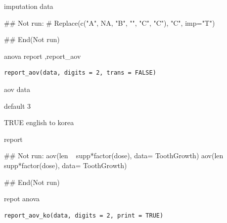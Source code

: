 \documentclass[a4paper]{book}
\begin{document}
%
\begin{Value}
imputation data
\end{Value}
%
\begin{Examples}
\begin{ExampleCode}

\#\# Not run: 
# Replace(c("A", NA, "B", "", "C", "C"), "C", imp="T")

## End(Not run)

\end{ExampleCode}
\end{Examples}
%
\begin{Description}
anova report ,report\_aov
\end{Description}
%
\begin{Usage}
\begin{verbatim}
report_aov(data, digits = 2, trans = FALSE)
\end{verbatim}
\end{Usage}
%
\begin{Arguments}
\begin{ldescription}
\item[\code{data}] aov data

\item[\code{digits}] default 3

\item[\code{trans}] TRUE english to korea
\end{ldescription}
\end{Arguments}
%
\begin{Value}
report
\end{Value}
%
\begin{Examples}
\begin{ExampleCode}
\#\# Not run: 
aov(len ~ supp*factor(dose), data= ToothGrowth) %
aov(len ~ supp*factor(dose), data= ToothGrowth) %



## End(Not run)


\end{ExampleCode}
\end{Examples}
%
\begin{Description}
repot anova
\end{Description}
%
\begin{Usage}
\begin{verbatim}
report_aov_ko(data, digits = 2, print = TRUE)
\end{verbatim}
\end{Usage}
\end{document}
